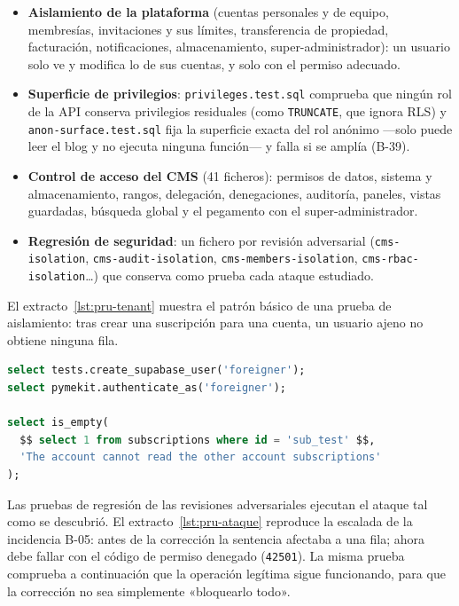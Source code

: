 \begin{itemize}
  \item \textbf{Aislamiento de la plataforma} (cuentas personales y de
        equipo, membresías, invitaciones y sus límites, transferencia de
        propiedad, facturación, notificaciones, almacenamiento,
        super-administrador): un usuario solo ve y modifica lo de sus
        cuentas, y solo con el permiso adecuado.
  \item \textbf{Superficie de privilegios}: \texttt{privileges.test.sql}
        comprueba que ningún rol de la API conserva privilegios residuales
        (como \texttt{TRUNCATE}, que ignora RLS) y \texttt{anon-surface.test.sql}
        fija la superficie exacta del rol anónimo ---solo puede leer el blog
        y no ejecuta ninguna función--- y falla si se amplía (B-39).
  \item \textbf{Control de acceso del CMS} (41 ficheros): permisos de datos,
        sistema y almacenamiento, rangos, delegación, denegaciones,
        auditoría, paneles, vistas guardadas, búsqueda global y el pegamento
        con el super-administrador.
  \item \textbf{Regresión de seguridad}: un fichero por revisión adversarial
        (\texttt{cms-isolation}, \texttt{cms-audit-isolation},
        \texttt{cms-members-isolation}, \texttt{cms-rbac-isolation}\ldots) que
        conserva como prueba cada ataque estudiado.
\end{itemize}

El extracto~\ref{lst:pru-tenant} muestra el patrón básico de una prueba de
aislamiento: tras crear una suscripción para una cuenta, un usuario ajeno no
obtiene ninguna fila.

\begin{lstlisting}[style=pymekitpru, language=SQL, caption={Aislamiento de la facturación entre cuentas (\texttt{team-billing-subscriptions.test.sql}, recortado).}, label={lst:pru-tenant}]
select tests.create_supabase_user('foreigner');
select pymekit.authenticate_as('foreigner');

select is_empty(
  $$ select 1 from subscriptions where id = 'sub_test' $$,
  'The account cannot read the other account subscriptions'
);
\end{lstlisting}

Las pruebas de regresión de las revisiones adversariales ejecutan el ataque
tal como se descubrió. El extracto~\ref{lst:pru-ataque} reproduce la escalada
de la incidencia B-05: antes de la corrección la sentencia afectaba a una
fila; ahora debe fallar con el código de permiso denegado (\texttt{42501}).
La misma prueba comprueba a continuación que la operación legítima sigue
funcionando, para que la corrección no sea simplemente «bloquearlo todo».

